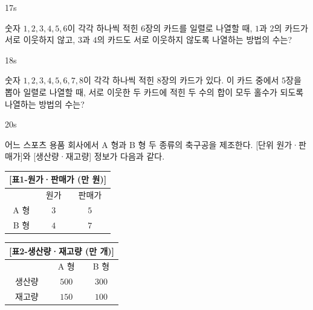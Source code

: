 \documentclass[10pt]{article}
\begin{document}
\setlength{\probboxheight}{100mm}
\begin{pagepair}
\noindent
\begin{minipage}[t][210mm][t]{0.46\linewidth}
\begin{minipage}[t][\probboxheight][t]{\linewidth}
\begin{problem}{17}{s}
\par\smallskip
숫자 $1, 2, 3, 4, 5, 6$이 각각 하나씩 적힌 $6$장의 카드를 일렬로 나열할 때, $1$과 $2$의 카드가 서로 이웃하지 않고, $3$과 $4$의 카드도 서로 이웃하지 않도록 나열하는 방법의 수는?
\begin{choices}
\end{choices}
\end{problem}
\end{minipage}
\par\vspace{4mm}
\begin{minipage}[t][\probboxheight][t]{\linewidth}
\begin{problem}{18}{s}
\par\smallskip
숫자 $1, 2, 3, 4, 5, 6, 7, 8$이 각각 하나씩 적힌 $8$장의 카드가 있다. 이 카드 중에서 $5$장을 뽑아 일렬로 나열할 때, 서로 이웃한 두 카드에 적힌 두 수의 합이 모두 홀수가 되도록 나열하는 방법의 수는?
\begin{choices}
\end{choices}
\end{problem}
\end{minipage}
\end{minipage}\hfill
\begin{minipage}[t][210mm][t]{0.46\linewidth}
\begin{problem}{20}{s}
\par\smallskip
어느 스포츠 용품 회사에서 A 형과 B 형 두 종류의 축구공을 제조한다. [단위 원가·판매가]와 [생산량·재고량] 정보가 다음과 같다.

\begin{center}
\small
\begin{tabular}{c|cc}
\multicolumn{3}{c}{[표1-원가·판매가 (만 원)]} \\ \hline
      & 원가 & 판매가 \\ \hline
A 형  & $3$    & $5$      \\
B 형  & $4$    & $7$
\end{tabular}
\quad
\begin{tabular}{c|cc}
\multicolumn{3}{c}{[표2-생산량·재고량 (만 개)]} \\ \hline
       & A 형 & B 형 \\ \hline
생산량 & $500$  & $300$  \\
재고량 & $150$  & $100$
\end{tabular}
\end{center}


\end{problem}
\end{minipage}
\end{pagepair}
\end{document}
